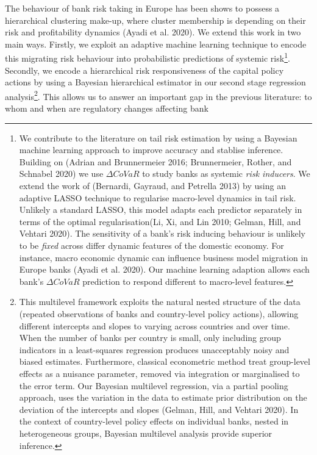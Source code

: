 \documentclass[
  10pt,
]{article}
\begin{document}
The behaviour of bank risk taking in Europe has been shows to possess a
hierarchical clustering make-up, where cluster membership is depending
on their risk and profitability dynamics (Ayadi et al. 2020). We extend
this work in two main ways. Firstly, we exploit an adaptive machine
learning technique to encode this migrating risk behaviour into
probabilistic predictions of systemic risk\footnote{We contribute to the
  literature on tail risk estimation by using a Bayesian machine
  learning approach to improve accuracy and stablise inference. Building
  on (Adrian and Brunnermeier 2016; Brunnermeier, Rother, and Schnabel
  2020) we use \(\Delta CoVaR\) to study banks as systemic \emph{risk
  inducers}. We extend the work of (Bernardi, Gayraud, and Petrella
  2013) by using an adaptive LASSO technique to regularise macro-level
  dynamics in tail risk. Unlikely a standard LASSO, this model adapts
  each predictor separately in terms of the optimal regularisation(Li,
  Xi, and Lin 2010; Gelman, Hill, and Vehtari 2020). The sensitivity of
  a bank's risk inducing behaviour is unlikely to be \emph{fixed} across
  differ dynamic features of the domestic economy. For instance, macro
  economic dynamic can influence business model migration in Europe
  banks (Ayadi et al. 2020). Our machine learning adaption allows each
  bank's \(\Delta CoVaR\) prediction to respond different to macro-level
  features.}. Secondly, we encode a hierarchical risk responsiveness of
the capital policy actions by using a Bayesian hierarchical estimator in
our second stage regression analysis\footnote{This multilevel framework
  exploits the natural nested structure of the data (repeated
  observations of banks and country-level policy actions), allowing
  different intercepts and slopes to varying across countries and over
  time. When the number of banks per country is small, only including
  group indicators in a least-squares regression produces unacceptably
  noisy and biased estimates. Furthermore, classical econometric method
  treat group-level effects as a nuisance parameter, removed via
  integration or marginalised to the error term. Our Bayesian multilevel
  regression, via a partial pooling approach, uses the variation in the
  data to estimate prior distribution on the deviation of the intercepts
  and slopes (Gelman, Hill, and Vehtari 2020). In the context of
  country-level policy effects on individual banks, nested in
  heterogeneous groups, Bayesian multilevel analysis provide superior
  inference.}. This allows us to answer an important gap in the previous
literature: to whom and when are regulatory changes affecting bank
\end{document}
